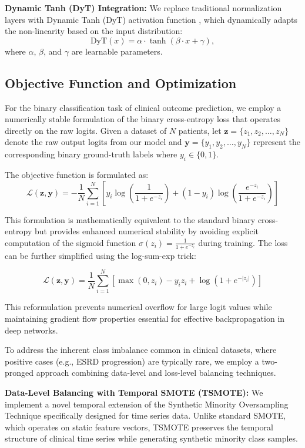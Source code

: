 \documentclass[letterpaper]{article}
\begin{document}
\begin{enumerate}
\textbf{Dynamic Tanh (DyT) Integration:}  
We replace traditional normalization layers with Dynamic Tanh (DyT) activation function \cite{zhu2025transformers}, which dynamically adapts the non-linearity based on the input distribution:
\[
\text{DyT}(x) = \alpha \cdot \tanh(\beta \cdot x + \gamma),
\]
where \(\alpha\), \(\beta\), and \(\gamma\) are learnable parameters.

\subsection{Objective Function and Optimization}

For the binary classification task of clinical outcome prediction, we employ a numerically stable formulation of the binary cross-entropy loss that operates directly on the raw logits. Given a dataset of $N$ patients, let $\mathbf{z} = \{z_1, z_2, \ldots, z_N\}$ denote the raw output logits from our model and $\mathbf{y} = \{y_1, y_2, \ldots, y_N\}$ represent the corresponding binary ground-truth labels where $y_i \in \{0, 1\}$.

The objective function is formulated as:
$$\mathcal{L}(\mathbf{z}, \mathbf{y}) = -\frac{1}{N} \sum_{i=1}^{N} \left[ y_i \log\left(\frac{1}{1 + e^{-z_i}}\right) + (1-y_i) \log\left(\frac{e^{-z_i}}{1 + e^{-z_i}}\right) \right]$$

This formulation is mathematically equivalent to the standard binary cross-entropy but provides enhanced numerical stability by avoiding explicit computation of the sigmoid function $\sigma(z_i) = \frac{1}{1 + e^{-z_i}}$ during training. The loss can be further simplified using the log-sum-exp trick:

$$\mathcal{L}(\mathbf{z}, \mathbf{y}) = \frac{1}{N} \sum_{i=1}^{N} \left[ \max(0, z_i) - y_i z_i + \log(1 + e^{-|z_i|}) \right]$$

This reformulation prevents numerical overflow for large logit values while maintaining gradient flow properties essential for effective backpropagation in deep networks.

To address the inherent class imbalance common in clinical datasets, where positive cases (e.g., ESRD progression) are typically rare, we employ a two-pronged approach combining data-level and loss-level balancing techniques.

\textbf{Data-Level Balancing with Temporal SMOTE (TSMOTE):} We implement a novel temporal extension of the Synthetic Minority Oversampling Technique specifically designed for time series data. Unlike standard SMOTE, which operates on static feature vectors, TSMOTE preserves the temporal structure of clinical time series while generating synthetic minority class samples.


\end{enumerate}
\end{document}
